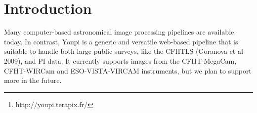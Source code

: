 \documentclass[11pt,twoside]{article}  %
\begin{document}

\setcounter{footnote}{3}


\begin{abstract} 
Youpi\footnote{http://youpi.terapix.fr/} stands for ``YOUpi is your processing PIpeline''. 
It is a modern, easy to use web application providing high level functionalities to perform 
data reduction on scientific FITS images. It is built on top of open source processing tools 
that are released to the community by Terapix, in order to organize your data on a computer 
cluster, to manage your processing jobs in real time (using Condor), and to facilitate teamwork 
by allowing fine-grain sharing of results and data.
\end{abstract}


\section{Introduction}

Many computer-based astronomical image processing pipelines are available today. In contrast, 
Youpi is a generic and versatile web-based pipeline that is suitable to handle both large 
public surveys, like the CFHTLS (Goranova et al 2009), and PI data. It currently supports 
images from the CFHT-MegaCam, CFHT-WIRCam and ESO-VISTA-VIRCAM instruments, but we plan to 
support more in the future. 
\end{document}
